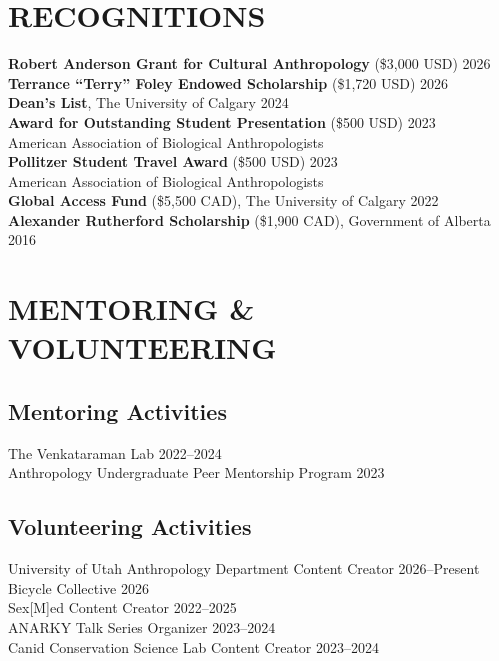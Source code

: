 \documentclass[a4paper,9pt]{extarticle}
\begin{document}
\noindent\begin{minipage}{\textwidth}
\section*{RECOGNITIONS}
    \noindent \textbf{Robert Anderson Grant for Cultural Anthropology} (\$3,000 USD) \hfill 2026 \\[5pt]
    \noindent \textbf{Terrance ``Terry'' Foley Endowed Scholarship} (\$1,720 USD) \hfill 2026 \\[5pt]
    \noindent \textbf{Dean's List}, The University of Calgary \hfill 2024 \\[5pt]
    \noindent \textbf{Award for Outstanding Student Presentation} (\$500 USD) \hfill 2023 \\
    American Association of Biological Anthropologists \\[5pt]
    \noindent \textbf{Pollitzer Student Travel Award} (\$500 USD) \hfill 2023 \\
    American Association of Biological Anthropologists \\[5pt]
    \noindent \textbf{Global Access Fund} (\$5,500 CAD), The University of Calgary \hfill 2022 \\[5pt]
    \noindent \textbf{Alexander Rutherford Scholarship} (\$1,900 CAD), Government of Alberta \hfill 2016
\end{minipage}
\vspace{1em}

\section*{MENTORING \& VOLUNTEERING}
    \subsection*{Mentoring Activities}
        \noindent The Venkataraman Lab \hfill 2022--2024 \\[5pt]
        \noindent Anthropology Undergraduate Peer Mentorship Program \hfill 2023

    \vspace{-2pt}
    \subsection*{Volunteering Activities}
        \noindent University of Utah Anthropology Department Content Creator \hfill 2026--Present \\[5pt]
        \noindent Bicycle Collective \hfill 2026 \\[5pt]
        \noindent Sex[M]ed Content Creator \hfill 2022--2025 \\[5pt]
        \noindent ANARKY Talk Series Organizer \hfill 2023--2024 \\[5pt]
        \noindent Canid Conservation Science Lab Content Creator \hfill 2023--2024
\end{document}
